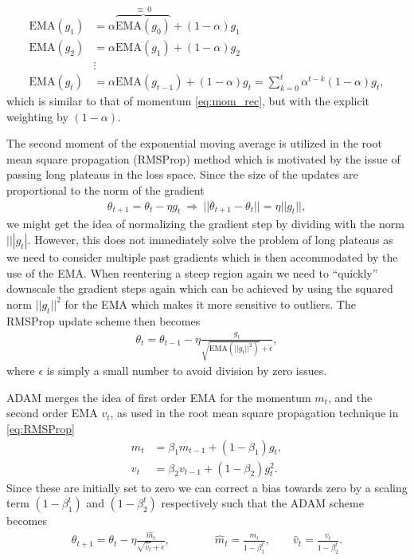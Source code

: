 \begin{align*}
    \text{EMA}(g_1) &= \alpha \overbrace{\text{EMA}(g_0)}^{\equiv \ 0} + (1-\alpha)g_1 \\
    \text{EMA}(g_2) &= \alpha \text{EMA}(g_1) + (1-\alpha)g_2 \\
    &\vdots \\
    \text{EMA}(g_t) &= \alpha \text{EMA}(g_{t-1}) + (1-\alpha)g_t  = \sum_{k=0}^t \alpha^{t-k}(1-\alpha)g_t,
\end{align*}
which is similar to that of momentum \cref{eq:mom_rec}, but with the explicit weighting by $(1-\alpha)$.

The second moment of the exponential moving average is utilized in the root mean square propagation (\acrshort{RMSProp}) method which is motivated by the issue of passing long plateaus in the loss space. Since the size of the updates are proportional to the norm of the gradient
\begin{align*}
  \theta_{t+1} = \theta_t - \eta g_t \ \Longrightarrow \ ||\theta_{t+1}-\theta_{t}|| = \eta ||g_t||,
\end{align*}
we might get the idea of normalizing the gradient step by dividing with the norm $|||g_t|$.  However, this does not immediately solve the problem of long plateaus as we need to consider multiple past gradients which is then accommodated by the use of the \acrshort{EMA}. When reentering a steep region again we need to ``quickly'' downscale the gradient steps again which can be achieved by using the squared norm $||g_t||^2$ for the \acrshort{EMA} which makes it more sensitive to outliers. The \acrshort{RMSProp} update scheme then becomes
\begin{align}
  \theta_t = \theta_{t-1} - \eta \frac{g_t}{\sqrt{\text{EMA}(||g_t||^2)}+ \epsilon},
  \label{eq:RMSProp}
\end{align}
where $\epsilon$ is simply a small number to avoid division by zero issues. 

ADAM merges the idea of first order \acrshort{EMA} for the momentum $m_t$, and the second order \acrshort{EMA} $v_t$, as used in the root mean square propagation technique in \cref{eq:RMSProp}
\begin{align*}
  m_t &= \beta_1 m_{t-1} + (1-\beta_1)g_t, \\
  v_t &= \beta_2 v_{t-1} + (1-\beta_2)g_t^2. 
\end{align*}
Since these are initially set to zero we can correct a bias towards zero by a scaling term $(1-\beta^t_1)$ and $(1-\beta^t_2)$ respectively such that the ADAM scheme becomes
\begin{align}
  \theta_{t+1} = \theta_t - \eta \frac{\hat{m}_t}{\sqrt{\hat{v}_t} + \epsilon}, \qquad \qquad \hat{m}_t = \frac{m_t}{1-\beta^t_1}, \qquad \hat{v}_t = \frac{v_t}{1-\beta^t_2}.
  \label{eq:ADAM}
\end{align}



